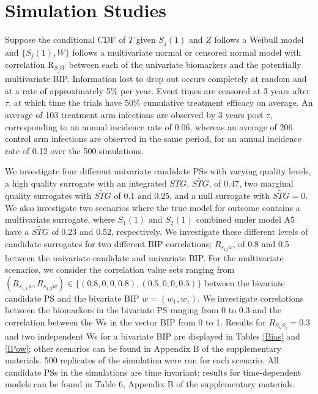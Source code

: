 \documentclass[times, doublespace]{simauth}
\begin{document}
\section{Simulation Studies}
Suppose the conditional CDF of $T$ given $S_j(1)$ and $Z$ follows a Weibull model and $\{S_j(1),W\}$ follows a multivariate normal or censored normal model with correlation R$_{S_jW}$ between each of the univariate biomarkers and the potentially multivariate BIP. Information lost to drop out occurs completely at random and at a rate of approximately 5\% per year. Event times are censored at 3 years after $\tau$, at which time the trials have 50\% cumulative treatment efficacy on average. An average of 103 treatment arm infections are observed by 3 years post $\tau$, corresponding to an annual incidence rate of 0.06, whereas an average of 206 control arm infections are observed in the same period, for an annual incidence rate of 0.12 over the 500 simulations. 

We investigate four different univariate candidate PSs with varying quality levels, a high quality surrogate with an integrated $STG$, $\widetilde{STG}$, of 0.47, two marginal quality surrogates with $\widetilde{STG}$ of 0.1 and 0.25, and a null surrogate with $\widetilde{STG} = 0$. We also investigate two scenarios where the true model for outcome contains a multivariate surrogate, where $S_1(1)$ and $S_2(1)$ combined under model A5 have a $\widetilde{STG}$ of 0.23 and 0.52, respectively. We investigate these different levels of candidate surrogates for two different BIP correlations; $R_{s_{1j}w}$, of 0.8 and 0.5 between the univariate candidate and univariate BIP. For the multivariate scenarios, we consider the correlation value sets ranging from $(R_{s_{1,1}w},R_{s_{1,2}w})\in\{(0.8,0,0,0.8), (0.5,0,0,0.5)\}$ between the bivariate candidate PS and the bivariate BIP $w=(w_1, w_1)$. We investigate correlations between the biomarkers in the bivariate PS ranging from 0 to 0.3 and the correlation between the Ws in the vector BIP from 0 to 1. Results for $R_{S_kS_j}=0.3$ and two independent Ws for a bivariate BIP are displayed in Tables \ref{Bias} and \ref{IPow}; other scenarios can be found in Appendix B of the supplementary materials. 500 replicates of the simulation were run for each scenario. All candidate PSs in the simulations are time invariant; results for time-dependent models can be found in Table 6, Appendix B of the supplementary materials.  
\end{document}
